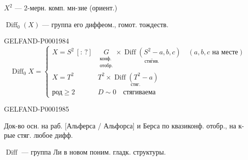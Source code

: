 





$X^2$ — 2-мерн. комп. мн-зие (ориент.)



$\operatorname{Diff}_0(X)$ — группа его диффеом., гомот. тождеств.






\begin{GelfandAdjacentEvidence}{GELFAND-P000198}{4}
\begin{equation*}
\operatorname{Diff}_0X=\left\{\begin{array}{ll}
X=S^2\ [\colon\,?]&\underset{\substack{\text{конф.}\\\text{отобр.}}}{G}\times\underset{\text{стягив.}}{\underline{\operatorname{Diff}(S^2-a,b,c)}}\quad(a,b,c\text{ на месте})\\[5mm]
X=T^2&T^2\times\underset{\text{стяг.}}{\operatorname{Diff}(T^2-a)}\\[5mm]
\text{род}\geq2&D\sim0\quad\text{стягиваема}
\end{array}\right.
\end{equation*}



\end{GelfandAdjacentEvidence}
\begin{GelfandAdjacentEvidence}{GELFAND-P000198}{5}

Док-во осн. на раб. [Альферса / Альфорса]
и Берса по квазиконф. отобр., на к-рые стяг. любое дифф.



\end{GelfandAdjacentEvidence}

$\operatorname{Diff}$ — группа Ли в новом поним. гладк. структуры.








